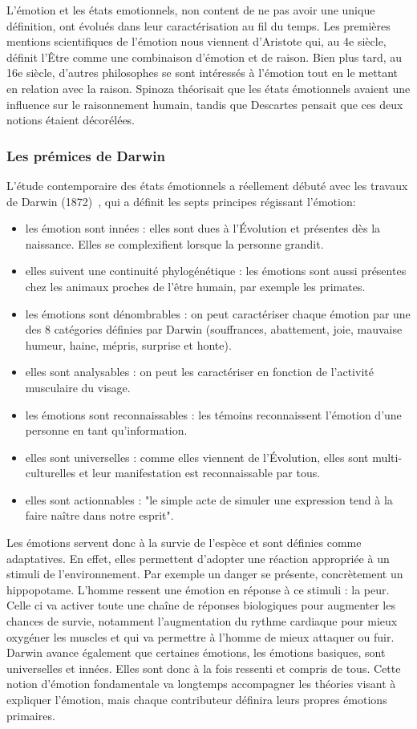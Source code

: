 L'émotion et les états emotionnels, non content de ne pas avoir une unique définition, ont évolués dans leur caractérisation au fil du temps. Les premières mentions scientifiques de l'émotion nous viennent d'Aristote qui, au 4e siècle, définit l'Être comme une combinaison d'émotion et de raison. Bien plus tard, au 16e siècle, d'autres philosophes se sont intéressés à l'émotion tout en le mettant en relation avec la raison. Spinoza théorisait que les états émotionnels avaient une influence sur le raisonnement humain, tandis que Descartes pensait que ces deux notions étaient décorélées.

\subsubsection{Les prémices de Darwin}
L'étude contemporaire des états émotionnels a réellement débuté avec les travaux de Darwin (1872)~\cite{Darwin1872}, qui a définit les septs principes régissant l'émotion:
\begin{itemize}
    \item les émotion sont innées : elles sont dues à l'Évolution et présentes dès la naissance. Elles se complexifient lorsque la personne grandit.
    \item elles suivent une continuité phylogénétique : les émotions sont aussi présentes chez les animaux proches de l'être humain, par exemple les primates.
    \item les émotions sont dénombrables : on peut caractériser chaque émotion par une des 8 catégories définies par Darwin (souffrances, abattement, joie, mauvaise humeur, haine, mépris, surprise et honte).
    \item elles sont analysables : on peut les caractériser en fonction de l'activité musculaire du visage.
    \item les émotions sont reconnaissables : les témoins reconnaissent l'émotion d'une personne en tant qu'information.
    \item elles sont universelles : comme elles viennent de l'Évolution, elles sont multi-culturelles et leur manifestation est reconnaissable par tous.
    \item elles sont actionnables : "le simple acte de simuler une expression tend à la faire naître dans notre esprit".
\end{itemize}
Les émotions servent donc à la survie de l’espèce et sont définies comme adaptatives. En effet, elles permettent d'adopter une réaction appropriée à un stimuli de l'environnement. Par exemple un danger se présente, concrètement un hippopotame. L'homme ressent une émotion en réponse à ce stimuli : la peur. Celle ci va activer toute une chaîne de réponses biologiques pour augmenter les chances de survie, notamment l'augmentation du rythme cardiaque pour mieux oxygéner les muscles et qui va permettre à l'homme de mieux attaquer ou fuir.
Darwin avance également que certaines émotions, les émotions basiques, sont universelles et innées. Elles sont donc à la fois ressenti et compris de tous. Cette notion d'émotion fondamentale va longtemps accompagner les théories visant à expliquer l'émotion, mais chaque contributeur définira leurs propres émotions primaires.

